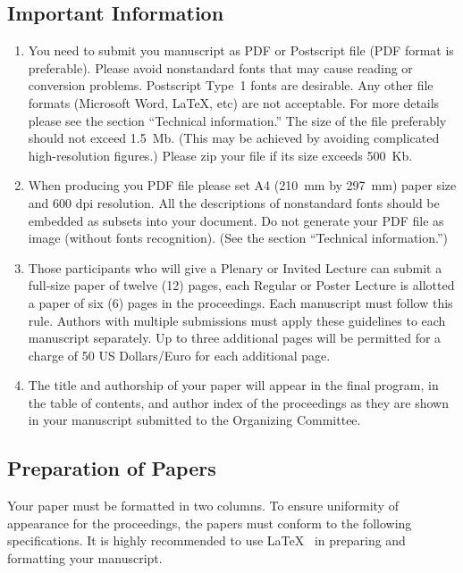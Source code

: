 \documentclass{physcon}
\begin{document}
\subsection{Important Information}

\begin{enumerate}
\item You need to submit you manuscript
as PDF or Postscript file (PDF format is preferable). 
Please avoid nonstandard fonts that may cause reading 
or conversion problems. Postscript Type~1 fonts are desirable.
Any other file formats (Microsoft Word, \LaTeX, etc) are not
acceptable. For more details please see the section
``Technical information.''
The size of the file preferably should not exceed 1.5~Mb. 
(This may be achieved by avoiding complicated high-resolution 
figures.) 
Please zip your file if its size exceeds 500~Kb. 

\item When producing you PDF file please set 
A4 (210~mm by 297~mm) paper size and 600 dpi resolution.
All the descriptions of nonstandard fonts should 
be embedded as subsets into your document.
Do not generate your PDF file as image (without fonts recognition).
(See the section ``Technical information.'')
     
\item  Those participants who will give a Plenary 
or Invited Lecture can submit a full-size 
paper of twelve (12) pages, each Regular or Poster Lecture 
is allotted a paper of six (6) pages in the proceedings.  
Each manuscript must follow this rule.  Authors with 
multiple submissions must apply these guidelines to each 
manuscript separately.
Up to three additional pages will be permitted for 
a charge of 50 US Dollars/Euro for each additional page.

\item The title and authorship of your paper will 
appear in the final program, in the table of contents, 
and author index of the proceedings as they are 
shown in your manuscript submitted to 
the Organizing Committee.  
\end{enumerate}
 
\subsection{Preparation of Papers}

Your paper must be formatted in two columns.  
To ensure uniformity of appearance for the proceedings, 
the papers must conform to the following specifications. 
It is highly recommended to use \LaTeX~ in preparing and
formatting your manuscript.
\end{document}
